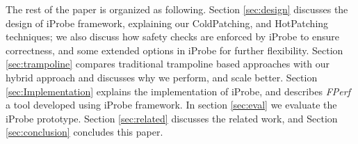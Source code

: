 %




The rest of the paper is organized as following. 
Section \ref{sec:design} discusses the design of iProbe framework, explaining our ColdPatching, and HotPatching techniques;
we also discuss how safety checks are enforced by iProbe to ensure correctness, and some extended options in iProbe for further flexibility.
Section \ref{sec:trampoline} compares traditional trampoline based approaches with our hybrid approach and discusses why we perform, and scale better.
Section \ref{sec:Implementation} explains the implementation of iProbe, 
and describes \emph{FPerf} a tool developed using iProbe framework. 
In section \ref{sec:eval} we evaluate the iProbe prototype. 
Section \ref{sec:related} discusses the related work,
and Section \ref{sec:conclusion} concludes this paper.

